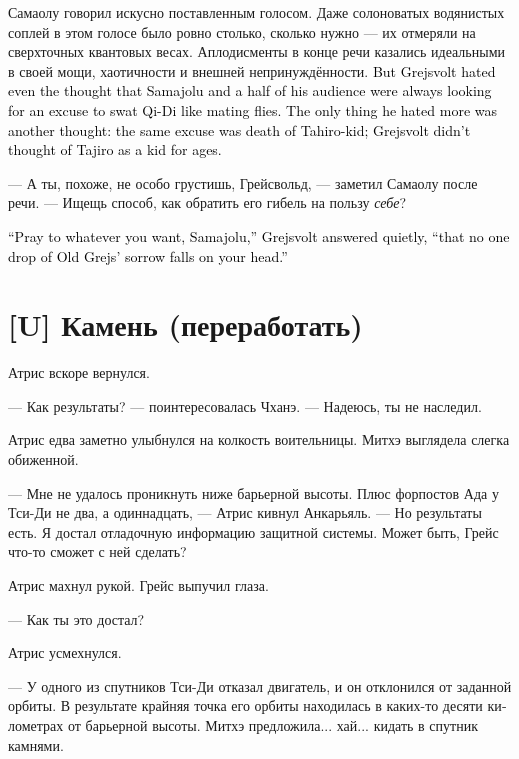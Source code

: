 \documentclass[a4paper,12pt,fleqn]{book}\usepackage{cooltooltips}\usepackage{polyglossia}\setdefaultlanguage[babelshorthands=true]{russian}\setotherlanguage{english}\defaultfontfeatures{Ligatures=TeX,Mapping=tex-text} \usepackage{xcolor}\definecolor{lightgray}{HTML}{bbbbbb}\color{lightgray}\newcommand{\ml}[3]{\textenglish{\textcolor{black}{#3}}}
\begin{document}
Самаолу говорил искусно поставленным голосом.
Даже солоноватых водянистых соплей в этом голосе было ровно столько, сколько нужно --- их отмеряли на сверхточных квантовых весах.
Аплодисменты в конце речи казались идеальными в своей мощи, хаотичности и внешней непринуждённости.
\ml{$0$}
{Но Грейсвольду было противно от мысли, что Самаолу и половина его слушателей давно искали повод прихлопнуть Тси-Ди, как спаривающихся мух.}
{But Grejsvolt hated even the thought that Samajolu and a half of his audience were always looking for an excuse to swat Qi-Di like mating flies.}
\ml{$0$}
{Ещё противнее становилось от того, что этим поводом оказалась смерть Тахиро --- мальчика Тахиро, о котором Грейс уже давно не думал, как о мальчике.}
{The only thing he hated more was another thought: the same excuse was death of Tahiro-kid; Grejsvolt didn't thought of Tajiro as a kid for ages.}

--- А ты, похоже, не особо грустишь, Грейсвольд, --- заметил Самаолу после речи.
--- Ищещь способ, как обратить его гибель на пользу \emph{себе}?

\ml{$0$}
{--- Молись кому хочешь, Самаолу, --- тихо ответил Грейсвольд, --- чтобы ни одна капля скорби старого Грейса не упала на твою голову.}
{``Pray to whatever you want, Samajolu,'' Grejsvolt answered quietly, ``that no one drop of Old Grejs' sorrow falls on your head.''}

\section{[U] Камень (переработать)}

Атрис вскоре вернулся.

--- Как результаты? --- поинтересовалась Чханэ.
--- Надеюсь, ты не наследил.

Атрис едва заметно улыбнулся на колкость воительницы.
Митхэ выглядела слегка обиженной.

--- Мне не удалось проникнуть ниже барьерной высоты.
Плюс форпостов Ада у Тси-Ди не два, а одиннадцать, --- Атрис кивнул Анкарьяль.
--- Но результаты есть.
Я достал отладочную информацию защитной системы.
Может быть, Грейс что-то сможет с ней сделать?

Атрис махнул рукой.
Грейс выпучил глаза.

--- Как ты это достал?

Атрис усмехнулся.

--- У одного из спутников Тси-Ди отказал двигатель, и он отклонился от заданной орбиты.
В результате крайняя точка его орбиты находилась в каких-то десяти километрах от барьерной высоты.
Митхэ предложила... хай... кидать в спутник камнями.
\end{document}
